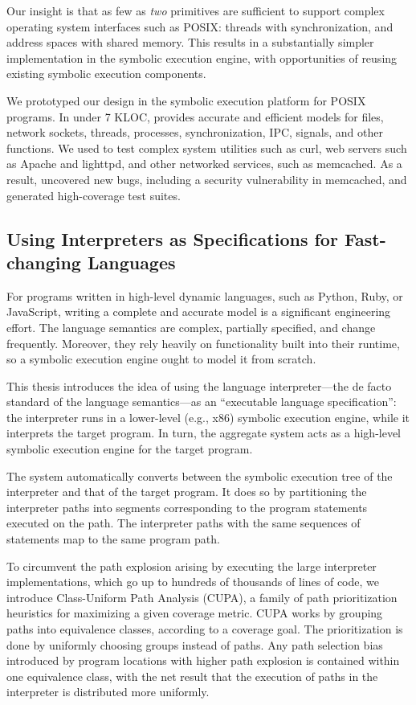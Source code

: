 Our insight is that as few as \emph{two} primitives are sufficient to support complex operating system interfaces such as POSIX: threads with synchronization, and address spaces with shared memory.
%
This results in a substantially simpler implementation in the symbolic execution engine, with opportunities of reusing existing symbolic execution components.

We prototyped our design in the \emph{\cnine} symbolic execution platform for POSIX programs.  In under 7 KLOC, \cnine provides accurate and efficient models for files, network sockets, threads, processes, synchronization, IPC, signals, and other functions.
%
We used \cnine to test complex system utilities such as \textsf{curl}, web servers such as Apache and lighttpd, and other networked services, such as memcached.
%
As a result, \cnine uncovered new bugs, including a security vulnerability in memcached, and generated high-coverage test suites.


\subsection{Using Interpreters as Specifications for Fast-changing Languages}

For programs written in high-level dynamic languages, such as Python, Ruby, or JavaScript, writing a complete and accurate model is a significant engineering effort.
%
The language semantics are complex, partially specified, and change frequently.  Moreover, they rely heavily on functionality built into their runtime, so a symbolic execution engine ought to model it from scratch.

This thesis introduces the idea of using the language interpreter---the de facto standard of the language semantics---as an ``executable language specification'': the interpreter runs in a lower-level (e.g., x86) symbolic execution engine, while it interprets the target program.  In turn, the aggregate system acts as a high-level symbolic execution engine for the target program.

The system automatically converts between the symbolic execution tree of the interpreter and that of the target program.
%
It does so by partitioning the interpreter paths into segments corresponding to the program statements executed on the path.  The interpreter paths with the same sequences of statements map to the same program path.

To circumvent the path explosion arising by executing the large interpreter implementations, which go up to hundreds of thousands of lines of code, we introduce Class-Uniform Path Analysis (CUPA), a family of path prioritization heuristics for maximizing a given coverage metric.
%
CUPA works by grouping paths into equivalence classes, according to a coverage goal.  The prioritization is done by uniformly choosing groups instead of paths.  Any path selection bias introduced by program locations with higher path explosion is contained within one equivalence class, with the net result that the execution of paths in the interpreter is distributed more uniformly.

